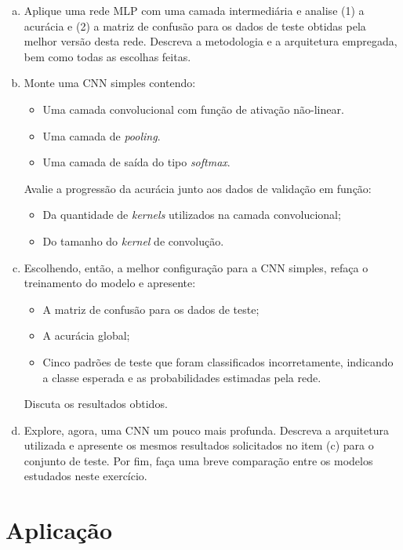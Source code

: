 \documentclass[final,5p]{elsarticle}
\numberwithin{equation}{section}
\begin{document}
    \begin{enumerate}[(a)]
        \item Aplique uma rede MLP com uma camada intermediária e analise (1) a acurácia e (2) a matriz de confusão para os dados de teste obtidas pela melhor versão desta rede. Descreva a metodologia e a arquitetura empregada, bem como todas as escolhas feitas.
        \item Monte uma CNN simples contendo:
        \begin{itemize}
            \item Uma camada convolucional com função de ativação não-linear.
            \item Uma camada de \emph{pooling}.
            \item Uma camada de saída do tipo \emph{softmax}.
        \end{itemize}
        Avalie a progressão da acurácia junto aos dados de validação em função:
        \begin{itemize}
            \item Da quantidade de \emph{kernels} utilizados na camada convolucional;
            \item Do tamanho do \emph{kernel} de convolução.
        \end{itemize}
        \item Escolhendo, então, a melhor configuração para a CNN simples, refaça o treinamento do modelo e apresente:
        \begin{itemize}
            \item A matriz de confusão para os dados de teste;
            \item A acurácia global;
            \item Cinco padrões de teste que foram classificados incorretamente, indicando a classe esperada e as probabilidades estimadas pela rede.
        \end{itemize}
        Discuta os resultados obtidos.
        \item Explore, agora, uma CNN um pouco mais profunda. Descreva a arquitetura utilizada e apresente os mesmos resultados solicitados no item (c) para o conjunto de teste. Por fim, faça uma breve comparação entre os modelos estudados neste exercício.
    \end{enumerate}


\section{Aplicação}
\end{document}
